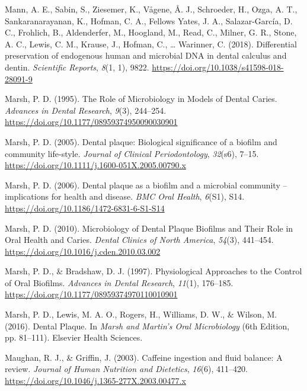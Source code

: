 \documentclass[
  letterpaper,
]{book}
\newlength{\cslhangindent}
\newlength{\cslentryspacingunit} %
\newenvironment{CSLReferences}[2] %
 {%
  \setlength{\parindent}{0pt}
  \ifodd #1
  \let\oldpar\par
  \def\par{\hangindent=\cslhangindent\oldpar}
  \fi
  \setlength{\parskip}{#2\cslentryspacingunit}
 }%
 {}
\begin{document}
\begin{CSLReferences}{1}{0}
\leavevmode{}%
Mann, A. E., Sabin, S., Ziesemer, K., Vågene, Å. J., Schroeder, H.,
Ozga, A. T., Sankaranarayanan, K., Hofman, C. A., Fellows Yates, J. A.,
Salazar-García, D. C., Frohlich, B., Aldenderfer, M., Hoogland, M.,
Read, C., Milner, G. R., Stone, A. C., Lewis, C. M., Krause, J., Hofman,
C., \ldots{} Warinner, C. (2018). Differential preservation of
endogenous human and microbial {DNA} in dental calculus and dentin.
\emph{Scientific Reports}, \emph{8}(1, 1), 9822.
\url{https://doi.org/10.1038/s41598-018-28091-9}

\leavevmode{}%
Marsh, P. D. (1995). The {Role} of {Microbiology} in {Models} of {Dental
Caries}. \emph{Advances in Dental Research}, \emph{9}(3), 244--254.
\url{https://doi.org/10.1177/08959374950090030901}

\leavevmode{}%
Marsh, P. D. (2005). Dental plaque: Biological significance of a biofilm
and community life-style. \emph{Journal of Clinical Periodontology},
\emph{32}(s6), 7--15.
\url{https://doi.org/10.1111/j.1600-051X.2005.00790.x}

\leavevmode{}%
Marsh, P. D. (2006). Dental plaque as a biofilm and a microbial
community -- implications for health and disease. \emph{BMC Oral
Health}, \emph{6}(S1), S14.
\url{https://doi.org/10.1186/1472-6831-6-S1-S14}

\leavevmode{}%
Marsh, P. D. (2010). Microbiology of {Dental Plaque Biofilms} and {Their
Role} in {Oral Health} and {Caries}. \emph{Dental Clinics of North
America}, \emph{54}(3), 441--454.
\url{https://doi.org/10.1016/j.cden.2010.03.002}

\leavevmode{}%
Marsh, P. D., \& Bradshaw, D. J. (1997). Physiological {Approaches} to
the {Control} of {Oral Biofilms}. \emph{Advances in Dental Research},
\emph{11}(1), 176--185.
\url{https://doi.org/10.1177/08959374970110010901}

\leavevmode{}%
Marsh, P. D., Lewis, M. A. O., Rogers, H., Williams, D. W., \& Wilson,
M. (2016). Dental {Plaque}. In \emph{Marsh and {Martin}'s {Oral
Microbiology}} (6th Edition, pp. 81--111). {Elsevier Health Sciences}.

\leavevmode{}%
Maughan, R. J., \& Griffin, J. (2003). Caffeine ingestion and fluid
balance: A review. \emph{Journal of Human Nutrition and Dietetics},
\emph{16}(6), 411--420.
\url{https://doi.org/10.1046/j.1365-277X.2003.00477.x}


\end{CSLReferences}
\end{document}
